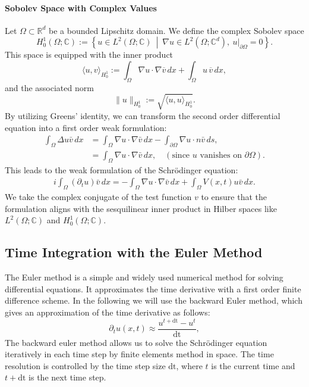 \documentclass{article}
\theoremstyle{definition}
\theoremstyle{plain}
\theoremstyle{remark}
\newcommand{\dt}{\text{dt}}
\begin{document}
\paragraph{Sobolev Space with Complex Values}
Let $\Omega \subset \mathbb{R}^d$ be a bounded Lipschitz domain. We define the complex Sobolev space
\[
H_0^1(\Omega; \mathbb{C}) := \left\{ u \in L^2(\Omega; \mathbb{C}) \ \middle| \ \nabla u \in L^2(\Omega; \mathbb{C}^d), \ u|_{\partial \Omega} = 0 \right\}.
\]
This space is equipped with the inner product
\[
\langle u, v \rangle_{H_0^1} := \int_\Omega \nabla u \cdot \nabla \overline{v} \, dx + \int_\Omega u \, \overline{v} \, dx,
\]
and the associated norm
\[
\|u\|_{H_0^1} := \sqrt{ \langle u, u \rangle_{H_0^1} }.
\]
By utilizing Greens' identity, we can transform the second order differential equation into a first order weak formulation:
\begin{align*}
  \int_{\Omega} \Delta u \bar{v} \, dx &= \int_{\Omega} \nabla u \cdot \nabla \bar{v} \, dx - \int_{\partial \Omega} \nabla u \cdot n \bar{v} \, ds,\\
  &= \int_{\Omega} \nabla u \cdot \nabla \bar{v} \, dx, \quad (\text{since } u \text{ vanishes on } \partial \Omega).
\end{align*}
This leads to the weak formulation of the Schrödinger equation:
\begin{align*}
    i \int_{\Omega} \left( \partial_t u \right) \bar{v} \, dx = - \int_{\Omega} \nabla u \cdot \nabla \bar{v} \, dx + \int_{\Omega} V(x,t) u \bar{v} \, dx.
\end{align*}
We take the complex conjugate of the test function $v$ to ensure that the formulation aligns with the sesquilinear inner product in Hilber spaces like $L^2(\Omega; \mathbb{C})$ and $H_0^1(\Omega; \mathbb{C})$.


\subsection*{Time Integration with the Euler Method}
The Euler method is a simple and widely used numerical method for solving  differential equations.
It approximates the time derivative with a first order finite difference scheme. In the following we will use the backward Euler method, which gives an approximation of the time derivative as follows:
\begin{equation}
    \partial_t u(x,t) \approx \frac{u^{t + \dt} - u^t}{\dt},
\end{equation}
The backward euler method allows us to solve the Schrödinger equation iteratively in each time step by finite elements method in space.
The time resolution is controlled by the time step size $\dt$, where $t$ is the current time and $t + \dt$ is the next time step.
\end{document}
